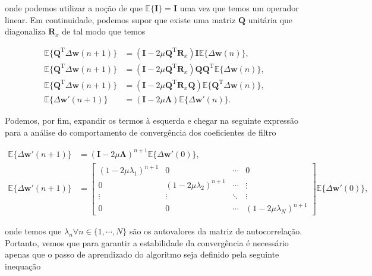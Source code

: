 \documentclass[a4paper,10pt]{article}
\begin{document}
\begin{enumerate}
\begin{enumerate}
						onde podemos utilizar a noção de que $\mathbb{E}\{ \mathbf{I} \} = \mathbf{I}$ uma vez que temos um operador linear. Em continuidade, podemos supor que existe uma matriz $\mathbf{Q}$ unitária que diagonaliza $\mathbf{R}_{x}$
						de tal modo que temos 

						\begin{align}
							\mathbb{E}\{ \mathbf{Q}^{\text{T}} \Delta \mathbf{w}(n + 1) \} &= \left( \mathbf{I} - 2 \mu \mathbf{Q}^{\text{T}} \mathbf{R}_{x} \right) \mathbf{I} \mathbb{E}\{ \Delta \mathbf{w}(n)\}, \\
							\mathbb{E}\{ \mathbf{Q}^{\text{T}} \Delta \mathbf{w}(n + 1) \} &= \left( \mathbf{I} - 2 \mu \mathbf{Q}^{\text{T}} \mathbf{R}_{x} \right) \mathbf{Q} \mathbf{Q}^{\text{T}} \mathbb{E}\{ \Delta \mathbf{w}(n)\}, \\
							\mathbb{E}\{ \mathbf{Q}^{\text{T}} \Delta \mathbf{w}(n + 1) \} &= \left( \mathbf{I} - 2 \mu \mathbf{Q}^{\text{T}} \mathbf{R}_{x} \mathbf{Q} \right) \mathbb{E}\{ \mathbf{Q}^{\text{T}} \Delta \mathbf{w}(n)\}, \\
							\mathbb{E}\{\Delta \mathbf{w}'(n + 1)\} &= \left( \mathbf{I} - 2 \mu \mathbf{\Lambda} \right) \mathbb{E}\{\Delta \mathbf{w}'(n)\}.
						\end{align}

						Podemos, por fim, expandir os termos à esquerda e chegar na seguinte expressão para a análise do comportamento de convergência dos coeficientes de filtro

						\begin{align}
							\mathbb{E}\{ \Delta \mathbf{w}'(n + 1) \} &= \left( \mathbf{I} - 2 \mu \mathbf{\Lambda} \right)^{n + 1} \mathbb{E}\{\Delta \mathbf{w}'(0)\}, \\
							\mathbb{E}\{ \Delta \mathbf{w}'(n + 1) \} &= 
							\begin{bmatrix}
								(1 - 2 \mu \lambda_{1})^{n + 1} & 0 & \cdots & 0 \\
								0 & (1 - 2 \mu \lambda_{2})^{n + 1} & \cdots & \vdots \\
								\vdots & \vdots & \ddots & \vdots \\
								0 & 0 & \cdots & (1 - 2 \mu \lambda_{N})^{n + 1}
							\end{bmatrix} 
							\mathbb{E}\{ \Delta \mathbf{w}'(0)\},	
						\end{align}

						onde temos que $\lambda_{n} \forall n \in \{1, \cdots, N\}$ são os autovalores da matriz de autocorrelação. Portanto, vemos que para garantir a estabilidade da convergência é necessário 
						apenas que o passo de aprendizado do algoritmo seja definido pela seguinte inequação


\end{enumerate}
\end{enumerate}
\end{document}
